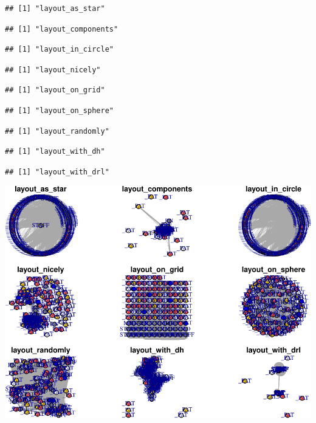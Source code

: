 \documentclass[]{elsarticle} %
\makeatletter
\def\maxwidth{\ifdim\Gin@nat@width>\linewidth\linewidth
\else\Gin@nat@width\fi}
\let\Oldincludegraphics\includegraphics
\renewcommand{\includegraphics}[1]{\Oldincludegraphics[width=\maxwidth]{#1}}
\makeatother
\begin{document}
\begin{verbatim}
## [1] "layout_as_star"
\end{verbatim}

\begin{verbatim}
## [1] "layout_components"
\end{verbatim}

\begin{verbatim}
## [1] "layout_in_circle"
\end{verbatim}

\begin{verbatim}
## [1] "layout_nicely"
\end{verbatim}

\begin{verbatim}
## [1] "layout_on_grid"
\end{verbatim}

\begin{verbatim}
## [1] "layout_on_sphere"
\end{verbatim}

\begin{verbatim}
## [1] "layout_randomly"
\end{verbatim}

\begin{verbatim}
## [1] "layout_with_dh"
\end{verbatim}

\begin{verbatim}
## [1] "layout_with_drl"
\end{verbatim}

\includegraphics{Flynn_Project_files/figure-latex/unnamed-chunk-1-1.pdf}
\end{document}
